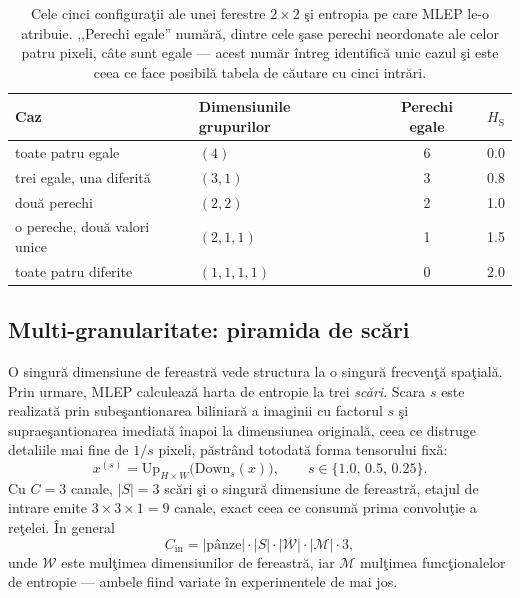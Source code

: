 \begin{table}[t]
  \centering
  \caption{Cele cinci configuraţii ale unei ferestre $2\times2$ şi entropia pe
  care MLEP le-o atribuie. ,,Perechi egale'' numără, dintre cele şase perechi
  neordonate ale celor patru pixeli, câte sunt egale --- acest număr întreg
  identifică unic cazul şi este ceea ce face posibilă tabela de căutare cu cinci
  intrări.}
  \label{tab:2x2}
  \begin{tabular}{llcc}
    \toprule
    Caz & Dimensiunile grupurilor & Perechi egale & $H_{\text{S}}$ \\
    \midrule
    toate patru egale              & $(4)$       & 6 & 0.0 \\
    trei egale, una diferită       & $(3,1)$     & 3 & 0.8 \\
    două perechi                   & $(2,2)$     & 2 & 1.0 \\
    o pereche, două valori unice   & $(2,1,1)$   & 1 & 1.5 \\
    toate patru diferite           & $(1,1,1,1)$ & 0 & 2.0 \\
    \bottomrule
  \end{tabular}
\end{table}

\subsection{Multi-granularitate: piramida de scări}

O singură dimensiune de fereastră vede structura la o singură frecvenţă
spaţială. Prin urmare, MLEP calculează harta de entropie la trei \emph{scări}.
Scara $s$ este realizată prin subeşantionarea biliniară a imaginii cu factorul
$s$ şi supraeşantionarea imediată înapoi la dimensiunea originală, ceea ce
distruge detaliile mai fine de $1/s$ pixeli, păstrând totodată forma tensorului
fixă:
\begin{equation}
  x^{(s)} = \text{Up}_{H\times W}\big(\text{Down}_{s}(x)\big),
  \qquad s \in \{1.0,\, 0.5,\, 0.25\}.
\end{equation}
Cu $C=3$ canale, $|S| = 3$ scări şi o singură dimensiune de fereastră, etajul de
intrare emite $3 \times 3 \times 1 = 9$ canale, exact ceea ce consumă prima
convoluţie a reţelei. În general
\begin{equation}
  C_{\text{in}} = |\text{pânze}| \cdot |S| \cdot |\mathcal{W}| \cdot |\mathcal{M}| \cdot 3,
  \label{eq:channels}
\end{equation}
unde $\mathcal{W}$ este mulţimea dimensiunilor de fereastră, iar $\mathcal{M}$
mulţimea funcţionalelor de entropie --- ambele fiind variate în experimentele de
mai jos.


